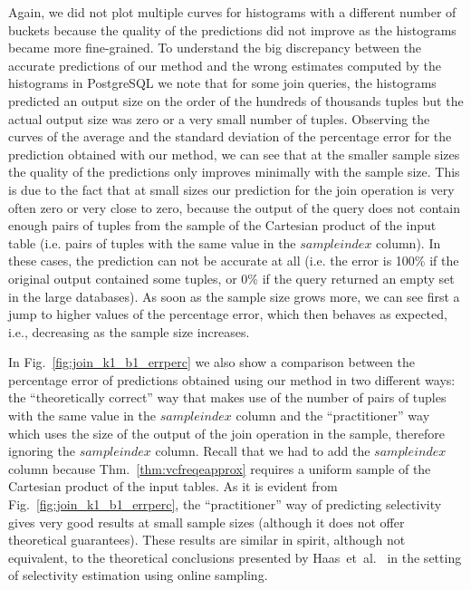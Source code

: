Again,
we did not plot multiple curves for histograms with a different number of
buckets because the quality of the predictions did not improve as the histograms
became more fine-grained. To understand the big discrepancy between the accurate
predictions of our method and the wrong estimates computed by the histograms in
PostgreSQL  we note that  for some join queries, the
histograms predicted an output size on the order of the hundreds of thousands
tuples but the actual output size was zero or a very small number of tuples.
Observing the curves of
the average and the standard deviation of the percentage error for the
prediction obtained with our method, we can see that at the smaller sample sizes
the quality of the predictions only improves minimally with the sample size.
This is due to the fact that at small sizes our prediction for the join
operation is very often zero or very close to zero, because the output of the
query does not contain enough pairs of tuples from the sample of the Cartesian
product of the input table (i.e. pairs of tuples with the same value in the
$sampleindex$ column). In these cases, the prediction can not be accurate at all
(i.e. the error is 100\% if the original output contained some tuples, or 0\% if
the query returned an empty set in the large databases). As soon as the sample
size grows more, we can see first a jump to higher values of the percentage
error, which then behaves as expected, i.e., decreasing as the sample size
increases. 

In Fig.~\ref{fig:join_k1_b1_errperc} we also show a
comparison between the percentage error of predictions obtained using our method
in two different ways: the ``theoretically correct'' way that makes use of the
number of pairs of tuples with the same value in the $sampleindex$ column and
the ``practitioner'' way which uses the size of the output of the join operation
in the sample, therefore ignoring the $sampleindex$ column. Recall that we had
to add the $sampleindex$ column because Thm.~\ref{thm:vcfreqeapprox} requires a
uniform sample of the Cartesian product of the input tables.
As it is evident from Fig.~\ref{fig:join_k1_b1_errperc}, the ``practitioner''
way of predicting selectivity gives very good results at small sample sizes
(although it does not offer theoretical guarantees). These results are similar
in spirit, although not equivalent, to the theoretical conclusions presented by
Haas~et~al.~\citeyearpar{HaasNSS96} in the setting of selectivity estimation
using online sampling.

